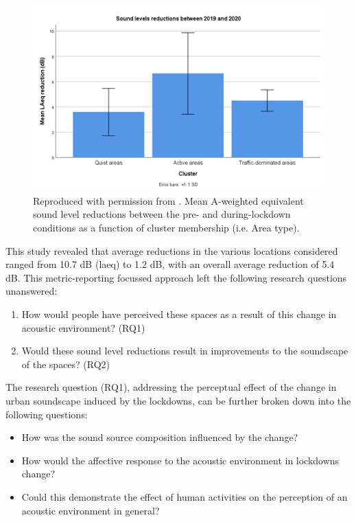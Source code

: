 \begin{figure}[h]
  \centering
  \includegraphics[width=\textwidth]{Figures/NoiseMappingLockdown Fig 8.png}
  \caption{Reproduced with permission from \citet{Aletta2020Assessing}. Mean A-weighted equivalent sound level reductions between the pre- and during-lockdown conditions as a function of cluster membership (i.e. Area type). \label{fig:NsMapLockRedux}}
\end{figure}


 This study revealed that average reductions in the various locations considered ranged from 10.7 dB (\gls{laeq}) to 1.2 dB, with an overall average reduction of 5.4 dB. This metric-reporting focussed approach left the following research questions unanswered:
 \begin{enumerate}
   \item How would people have perceived these spaces as a result of this change in acoustic environment? (RQ1)
   \item Would these sound level reductions result in improvements to the soundscape of the spaces? (RQ2)
 \end{enumerate}

 The  research question (RQ1), addressing the perceptual effect of the change in urban soundscape induced by the lockdowns, can be further broken down into the following questions:

 \begin{itemize}
   \item How was the sound source composition influenced by the change?
   \item How would the affective response to the acoustic environment in lockdowns change?
   \item Could this demonstrate the effect of human activities on the perception of an acoustic environment in general?
 \end{itemize}


